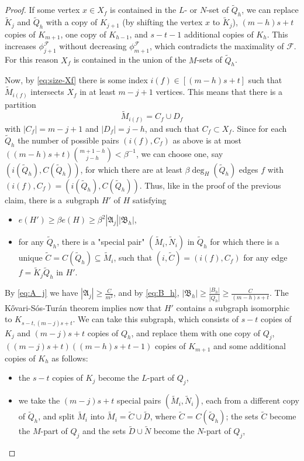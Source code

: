 \documentclass[10pt,a4paper]{amsart}
\def\cF{{\mathcal F}}
\def\fA{\mathfrak{A}}
\def\fB{\mathfrak{B}}
\begin{document}
\begin{proof}
            If some vertex $x\in X_f$ is contained in the $L$- or $N$-set of $\tilde Q_h$, we can replace $\tilde K_j$ and $\tilde Q_h$ with a copy of $K_{j+1}$ (by shifting the vertex $x$ to $\tilde K_j$), $(m-h)s+t$ copies of $K_{m+1}$, one copy of $K_{h-1}$, and $s-t-1$ additional copies of $K_h$. This increases $\phi_{j+1}^\cF$ without decreasing $\phi_{m+1}^\cF$, which contradicts the maximality of $\cF$. For this reason $X_f$ is contained in the union of the $M$-sets of $\tilde Q_h$. 
            
            Now, by \eqref{eq:size-Xf} there is some index $i(f)\in [(m-h)s+t]$ such that $\tilde M_{i(f)}$ intersects $X_f$ in at least $m-j+1$ vertices. This means that there is a partition 
            \[\tilde M_{i(f)}=C_f\cup D_f\]
            with $|C_f|=m-j+1$ and $|D_f|=j-h$, and such that $C_f\subset X_f$. Since for each $\tilde Q_h$ the number of possible pairs $(i(f), C_f)$ as above is at most $((m-h)s+t){m+1-h\choose j-h} < \beta^{-1}$, we can choose one, say $(i(\tilde Q_h), C(\tilde Q_h))$, for which there are at least $\beta \deg_H(\tilde Q_h)$ edges $f$ with $(i(f), C_f) = (i(\tilde Q_h),C(\tilde Q_h))$.
            Thus, like in the proof of the previous claim, there is a~subgraph $H'$ of $H$ satisfying
            \begin{itemize}
                \item $e(H')\geq \beta e(H) \geq  \beta ^2 |\fA_j| |\fB_h|$,
                \item for any $\tilde Q_h$, there is a "special pair" $(\tilde M_i, \tilde N_i)$ in $\tilde Q_h$ for which there is a unique $\tilde C=C(\tilde Q_h)\subseteq \tilde M_i$, such that $(i,\tilde C)=(i(f),C_f)$ for any edge $f=\tilde K_j \tilde Q_h$ in $H'$. 
            \end{itemize}

            
            By \eqref{eq:A_j} we have $|\fA_j|\geq \frac{C}{m^2}$, and by \eqref{eq:B_h}, $|\fB_h|\geq \frac{|B_h|}{|Q_h|}\geq\frac{C}{(m-h)s+t}$. The K\H{o}vari-S\'os-Tur\'an theorem implies now that $H'$ contains a subgraph isomorphic to $K_{s-t,(m-j)s+t}$. 
            We can take this subgraph, which consists of $s-t$ copies of $K_j$ and $(m-j)s+t$ copies of $Q_h$, and replace them with one copy of $Q_j$, $((m-j)s+t)((m-h)s+t-1)$ copies of $K_{m+1}$ and some additional copies of $K_h$ as follows:
            \begin{itemize}
                \item the $s-t$ copies of $K_j$ become the $L$-part of $Q_j$,
                \item we take the $(m-j)s+t$ special pairs $(\tilde M_i, \tilde N_i)$, each from a different copy of $\tilde Q_h$, and split $\tilde M_i$ into $\tilde M_i = \tilde C \cup \tilde D$, where $\tilde C = C(\tilde Q_h)$; the sets $\tilde C$ become the $M$-part of $Q_j$ and the sets $\tilde D \cup \tilde N$ become the $N$-part of $Q_j$, 
                

\end{itemize}
\end{proof}
\end{document}

